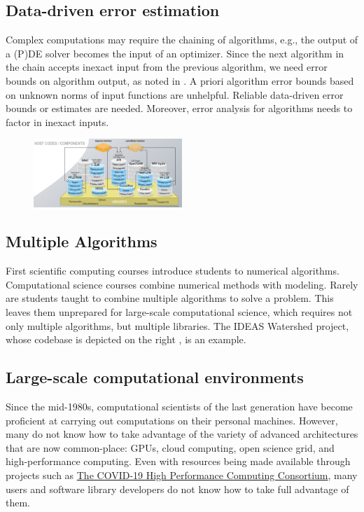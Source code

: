 \documentclass{amsart}
\begin{document}
\subsection{Data-driven error estimation} 
Complex computations may require the chaining of algorithms, e.g., the output of a (P)DE solver becomes the input of an optimizer.  Since the next algorithm in the chain accepts inexact input from the previous algorithm, 
we need error bounds on algorithm output, as noted in \cite{Ips21a}. A priori algorithm error bounds based on unknown norms of input functions are unhelpful.  Reliable data-driven error bounds or estimates are needed. Moreover, error analysis for algorithms needs to factor in inexact inputs.

\begin{figure}
    \includegraphics[width = 0.5\textwidth]{cropped-ideas-watersheds-software-ecosystem-road.jpg}
\end{figure}

\subsection{Multiple Algorithms} 
First scientific computing courses \cite{BurFaiBur16a} introduce students to numerical algorithms.  Computational science courses \cite{HolEic19a,ShifShif14a} combine numerical methods with modeling.  Rarely are students taught to combine multiple algorithms to solve a problem.  This leaves them unprepared for  large-scale computational science, which requires not only multiple algorithms, but multiple libraries. The IDEAS Watershed project, whose codebase is depicted on the right \cite{IDEASWatershedPict}, is an example.

\subsection{Large-scale computational environments} 
Since the mid-1980s, computational scientists of the last generation have become proficient at carrying out computations on their personal machines.  However, many do not know how to take advantage of the variety of advanced architectures that are now common-place:  GPUs, cloud computing, open science grid, and high-performance computing.  Even with resources being made available through projects such as \href{https://covid19-hpc-consortium.org}{The COVID-19 High Performance Computing Consortium}, many users and software library developers do not know how to take full advantage of them.
\end{document}
